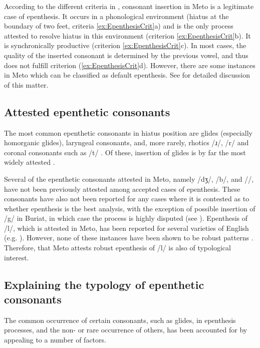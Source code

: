\documentclass[output=paper]{langscibook}
\begin{document}
According to the
different criteria in , 
consonant insertion in Meto 
is a legitimate case of epenthesis. It occurs in 
a phonological environment (hiatus at the boundary of two feet, criteria \ref{ex:EpenthesisCrit}a) 
and   is the only process attested to resolve hiatus in this environment (criterion \ref{ex:EpenthesisCrit}b). 
It is synchronically productive (criterion \ref{ex:EpenthesisCrit}c). 
In most cases, the quality of the inserted 
consonant is determined by the previous vowel,
 and thus does not fulfill criterion (\ref{ex:EpenthesisCrit}d).
However, there are some instances in 
Meto which can be classified as  default epenthesis. 
	See  for detailed discussion of this matter. 
	
\subsection{Attested epenthetic consonants}\label{sec:AttestedCs}
\largerpage
The most common epenthetic  consonants in hiatus position 
are glides (especially homorganic glides),
laryngeal consonants, and, more rarely, rhotics /ɹ/, /r/
and coronal consonants such as /t/ \citep{dl06, ca11}.
Of these, insertion of glides is by far
the most widely attested \citep{pi03, uf07, ca11}. 

Several of the  epenthetic  consonants attested in Meto, namely \mbox{/dʒ/,} /b/, and \mbox{/\gw/},
have not been previously attested among accepted cases of epenthesis. 
These consonants have also not been reported for any cases where it is contested 
as to whether epenthesis is the best analysis,
with the exception of possible insertion of /g/ in Buriat,
in which case the process is highly disputed (see ). 
Epenthesis of /l/, which is attested in Meto,
has been reported for several varieties of English (e.g. \citealt{gi02, gi99, ki10}).
However, none of these instances have been shown to be robust patterns \citep[7]{st14}.
Therefore, that Meto attests robust epenthesis of /l/ is also of typological interest. 
 							
\subsection{Explaining the typology of epenthetic consonants}\label{sec:TypExplain}
The common occurrence of certain consonants, such as glides, in epenthesis processes,
and the non- or rare  occurrence of others, has been accounted for by appealing to a
number of factors. 
\end{document}
